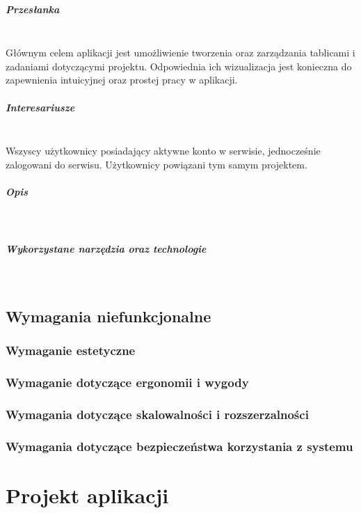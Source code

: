 \documentclass[eng,printmode]{mgr}
\begin{document}
\paragraph{Przesłanka}\ \\
Głównym celem aplikacji jest umożliwienie tworzenia oraz zarządzania tablicami i zadaniami dotyczącymi projektu. Odpowiednia ich wizualizacja jest konieczna do zapewnienia intuicyjnej oraz prostej pracy w aplikacji.

\paragraph{Interesariusze}\ \\
Wszyscy użytkownicy posiadający aktywne konto w serwisie, jednocześnie zalogowani do serwisu. Użytkownicy powiązani tym samym projektem.

\paragraph{Opis}\ \\

\paragraph{Wykorzystane narzędzia oraz technologie}\ \\
\newpage

\section{Wymagania niefunkcjonalne}
\subsection{Wymaganie estetyczne}
\subsection{Wymaganie dotyczące ergonomii i wygody}
\subsection{Wymagania dotyczące skalowalności i rozszerzalności}
\subsection{Wymagania dotyczące bezpieczeństwa korzystania z systemu}
\chapter{Projekt aplikacji}
\end{document}
